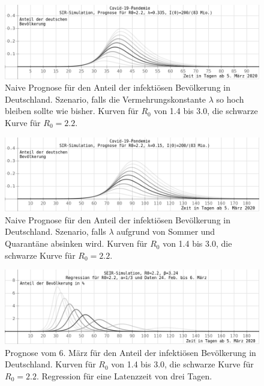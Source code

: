 \documentclass[a4paper,11pt,fleqn,twocolumn,twoside,dvipdfmx]{scrartcl}
\numberwithin{equation}{section}
\begin{document}
\begin{figure}[h]
\includegraphics[width=16cm]{img/Covid-19-Simulation1.png}
\caption{Naive Prognose für den Anteil der infektiösen Bevölkerung
in Deutschland.\newline
Szenario, falls die Vermehrungskonstante $\lambda$ so hoch bleiben
sollte wie bisher.\newline
Kurven für $R_0$ von 1.4 bis 3.0, die schwarze Kurve für $R_0=2.2$.}
\end{figure}
\begin{figure}[h]
\includegraphics[width=16cm]{img/Covid-19-Simulation2.png}
\caption{Naive Prognose für den Anteil der infektiösen Bevölkerung
in Deutschland.\newline
Szenario, falls $\lambda$ aufgrund von Sommer und Quarantäne
absinken wird.\newline
Kurven für $R_0$ von 1.4 bis 3.0, die schwarze Kurve für $R_0=2.2$.}
\vspace{-6em}
\end{figure}

\clearpage
\begin{figure}[h]
\includegraphics[width=16cm]{img/Covid-19-Simulation3.png}
\caption{Prognose vom 6. März für den Anteil der infektiösen Bevölkerung
in Deutschland.\newline
Kurven für $R_0$ von 1.4 bis 3.0, die schwarze Kurve für $R_0=2.2$.\newline
Regression für eine Latenzzeit von drei Tagen.}
\vspace{-6em}
\end{figure}
\end{document}
